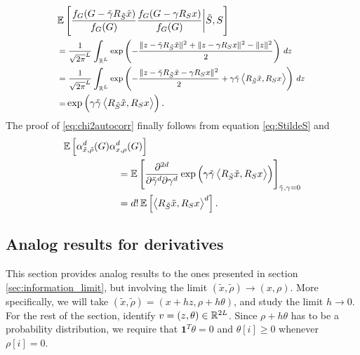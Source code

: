 \documentclass{IEEEtran}
\numberwithin{equation}{section}
\numberwithin{figure}{section}
\theoremstyle{plain}
\theoremstyle{definition}
\theoremstyle{remark}
\theoremstyle{plain}
\theoremstyle{remark}
\theoremstyle{plain}
\theoremstyle{plain}
\theoremstyle{remark}
\newcommand{\reals}{\mathbb{R}}
\newcommand{\RL}{\mathbb{R}^L}
\newcommand{\E}{\mathbb{E}}
\newcommand{\ones}{{\mathbf{1}}}
\newcommand{\error}{G}
\begin{document}
\begin{align*}
&\hspace{-2pt}\E\left[\frac{f_\error(\error- \tilde \gamma R_{\tilde S} \tilde x)}{f_\error(\error)}\frac{f_\error(\error- \gamma R_S x)}{f_\error(\error)}\bigg|\tilde S,S\right]\\
&\text{\footnotesize $\displaystyle= \frac1{\sqrt{2\pi}^L}\int_{\RL} \exp\left(-\frac{\|z- \tilde \gamma R_{\tilde S} \tilde x\|^2+\|z- \gamma R_{S} x\|^2-\|z\|^2}{2}\right) \,dz$}\\
&\text{\footnotesize $\displaystyle=\frac1{\sqrt{2\pi}^L}  \int_{\RL} \exp\left(-\frac{\|z- \tilde \gamma R_{\tilde S} \tilde x- \gamma R_{S} x\|^2}{2}+\gamma\tilde \gamma \left<R_{\tilde S} \tilde x,R_S x\right> \right) \,dz$}\\
&\text{\footnotesize $=$} \exp\left(\gamma\tilde \gamma \left<R_{\tilde S} \tilde x,R_S x\right> \right).
\end{align*}
The proof of \eqref{eq:chi2autocorr} finally follows from equation \eqref{eq:StildeS} and
\begin{align*}
\E\left[\alpha_{\tilde x,\tilde \rho}^d(\error)\alpha_{x,\rho}^d(\error)\right]\hspace{-30pt}&\\
&=\E\left[\frac{\partial^{2d}}{\partial \tilde \gamma^d\partial \gamma^d}\exp\left(\gamma\tilde \gamma \left<R_{\tilde S} \tilde x,R_S x\right> \right)\right]_{\tilde \gamma,\gamma=0}\\
&=d!\,\E\left[\left<R_{\tilde S} \tilde x,R_S x\right>^d\right].
\end{align*}

\subsection{Analog results for derivatives}
\label{sec:derivatives}

This section provides analog results to the ones presented in section \ref{sec:information_limit}, but involving the limit $(\tilde x,\tilde \rho) \rightarrow (x,\rho)$. More specifically, we will take $(\tilde x,\tilde \rho)=(x+hz,\rho+h\theta)$, and study the limit $h\rightarrow 0$. For the rest of the section, identify $v=\nobreak(z,\theta)\in \reals^{2L}$. Since $\rho+h\theta$ has to be a probability distribution, we require that $\ones^T \theta=0$ and $\theta[i]\ge 0$ whenever $\rho[i]= 0$.
\end{document}
